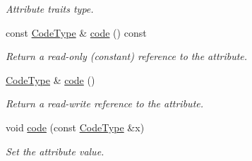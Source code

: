 \begin{DoxyCompactItemize}
\begin{DoxyCompactList}\small\item\em Attribute traits type. \item\end{DoxyCompactList}\item 
const \hyperlink{classopenstack_1_1xml_1_1CloudServersAPIFault_aa9f350c9dba08ae375b2a61568551550}{CodeType} \& \hyperlink{classopenstack_1_1xml_1_1CloudServersAPIFault_a32e2c9cf0730f014521e73eb88800b30}{code} () const 
\begin{DoxyCompactList}\small\item\em Return a read-\/only (constant) reference to the attribute. \item\end{DoxyCompactList}\item 
\hyperlink{classopenstack_1_1xml_1_1CloudServersAPIFault_aa9f350c9dba08ae375b2a61568551550}{CodeType} \& \hyperlink{classopenstack_1_1xml_1_1CloudServersAPIFault_accc277ca6215073b79b6fb08fedda366}{code} ()
\begin{DoxyCompactList}\small\item\em Return a read-\/write reference to the attribute. \item\end{DoxyCompactList}\item 
void \hyperlink{classopenstack_1_1xml_1_1CloudServersAPIFault_a6ad767f3b7ce5f9b93b83a8d93055261}{code} (const \hyperlink{classopenstack_1_1xml_1_1CloudServersAPIFault_aa9f350c9dba08ae375b2a61568551550}{CodeType} \&x)
\begin{DoxyCompactList}\small\item\em Set the attribute value. \item\end{DoxyCompactList}\end{DoxyCompactItemize}
